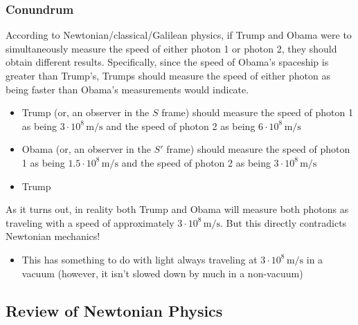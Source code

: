 \documentclass[a4paper]{article}
\begin{document}
		\subsubsection*{Conundrum}
		According to Newtonian/classical/Galilean physics, if Trump and Obama were to simultaneously measure the speed of either photon 1 or photon 2, they should obtain different results. Specifically, since the speed of Obama's spaceship is greater than Trump's, Trumps should measure the speed of either photon as being faster than Obama's measurements would indicate.
		\begin{itemize}
			\item Trump (or, an observer in the $S$ frame) should measure the speed of photon 1 as being $3 \cdot 10^8 \, \mathrm{m/s}$ and the speed of photon 2 as being $6 \cdot 10^8 \, \mathrm{m/s}$
			\item Obama (or, an observer in the $S'$ frame) should measure the speed of photon 1 as being $1.5 \cdot 10^8 \, \mathrm{m/s}$ and the speed of photon 2 as being $3 \cdot 10^8 \, \mathrm{m/s}$
			\item Trump
		\end{itemize}
		As it turns out, in reality both Trump and Obama will measure both photons as traveling with a speed of approximately $3 \cdot 10^{8} \, \mathrm{m/s}$. But this directly contradicts Newtonian mechanics! 
		\begin{itemize}
			\item This has something to do with light always traveling at $3 \cdot 10^8 \, \mathrm{m/s}$ in a vacuum (however, it isn't slowed down by much in a non-vacuum)
		\end{itemize}
	\subsection*{Review of Newtonian Physics}
\end{document}
